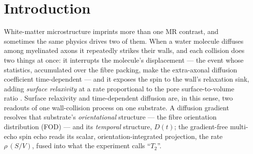 \section{Introduction}
\label{sec:intro}

White-matter microstructure imprints more than one MR contrast, and sometimes the
same physics drives two of them. When a water molecule diffuses among myelinated
axons it repeatedly strikes their walls, and each collision does two things at once:
it interrupts the molecule's displacement --- the event whose statistics,
accumulated over the fibre packing, make the extra-axonal diffusion coefficient
time-dependent \citep{Novikov2014, Burcaw2015} --- and it exposes the spin to the
wall's relaxation sink, adding \emph{surface relaxivity} \citep{Brownstein1979} at a
rate proportional to the pore surface-to-volume ratio \SV{}. Surface relaxivity and
time-dependent diffusion are, in this sense, two readouts of one wall-collision
process on one substrate. A diffusion gradient resolves that substrate's
\emph{orientational} structure --- the fibre orientation distribution (FOD) --- and
its \emph{temporal} structure, $D(t)$; the gradient-free multi-echo spin echo reads
its scalar, orientation-integrated projection, the rate $\rho\,(S/V)$, fused into
what the experiment calls ``$T_2$''.


